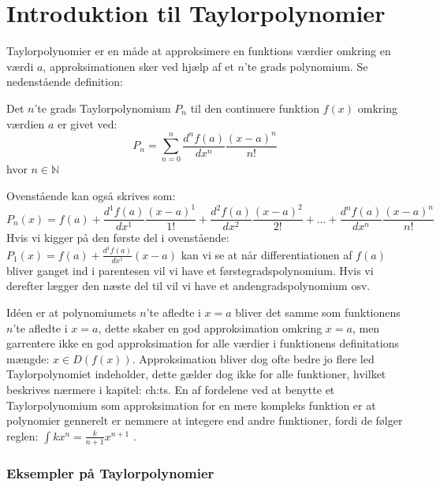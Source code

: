 \chapter{Introduktion til Taylorpolynomier}
\label{ch:tp}
Taylorpolynomier er en måde at approksimere en funktions værdier omkring en værdi $a$, 
approksimationen sker ved hjælp af et $n$'te grads polynomium. Se nedenstående definition: 
\begin{defn}
    Det $n$'te grads Taylorpolynomium $P_n$ til den continuere funktion $f(x)$ omkring værdien $a$ er givet ved:
    \[
    P_n = \sum^{n}_{n=0} \frac{d^n f(a)}{dx^n}\frac{(x-a)^{n}}{n!}
    \]
    hvor $n \in \mathbb{N}$
\end{defn}
\label{def:taylorPolynomium}
Ovenstående kan også skrives som:
    \[
    P_n(x)=f(a)+\frac{d^1 f(a)}{dx^1} \frac{(x-a)^{1}}{1!}+\frac{d^2 f(a)}{dx^2} \frac{(x-a)^{2}}{2!}+...+\frac{d^n f(a)}{dx^n} \frac{(x-a)^{n}}{n!}
    \]
Hvis vi kigger på den første del i ovenstående: $P_1(x)=f(a)+\frac{d^1 f(a)}{dx^1}(x-a)$ kan vi se at når differentiationen af $f(a)$ bliver ganget ind i parentesen vil vi have et førstegradspolynomium. 
Hvis vi derefter lægger den næste del til vil vi have et andengradspolynomium osv. 

Idéen er at polynomiumets $n$'te afledte i $x = a$ bliver det samme som funktionens $n$'te afledte i $x = a$, 
dette skaber en god approksimation omkring $x = a$, men garrentere ikke en god approksimation 
for alle værdier i funktionens definitations mængde: $x \in D(f(x))$. Approksimation bliver dog ofte bedre jo 
flere led Taylorpolynomiet indeholder, dette gælder dog ikke for alle funktioner, hvilket beskrives nærmere i kapitel: \refname{ch:ts}. 
En af fordelene ved at benytte et Taylorpolynomium som approksimation for en mere kompleks funktion
er at polynomier gennerelt er nemmere at integere end andre funktioner, fordi de følger reglen: $\int k x^n = \frac{k}{n + 1}x^{n + 1}$ .


\subsection*{Eksempler på Taylorpolynomier}